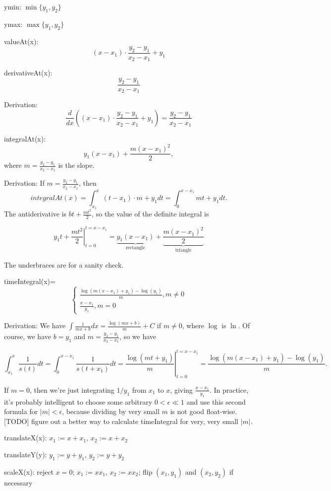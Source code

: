 \documentclass{article}
\begin{document}
ymin: $\min\{y_1, y_2\}$

ymax: $\max\{y_1, y_2\}$

valueAt(x): $$(x - x_1) \cdot \frac{y_2 - y_1}{x_2 - x_1} + y_1$$

derivativeAt(x): $$\frac{y_2-y_1}{x_2-x_1}$$

Derivation: $$\frac{d}{dx}\left((x - x_1) \cdot \frac{y_2 - y_1}{x_2 - x_1} + y_1\right) = \frac{y_2 - y_1}{x_2 - x_1}$$

integralAt(x): $$y_1(x-x_1) + \frac{m(x-x_1)^2}{2},$$ where $m=\frac{y_2 - y_1}{x_2 - x_1}$ is the slope.

Derivation: If $m=\frac{y_2 - y_1}{x_2 - x_1}$, then $$integralAt(x) = \int_{x_1}^x (t - x_1) \cdot m + y_1 dt = \int_{0}^{x-x_1} mt + y_1 dt.$$ The antiderivative is $bt + \frac{mt^2}{2}$, so the value of the definite integral is

$$\left. y_1t + \frac{mt^2}{2} \right\vert _ {t=0} ^ {t=x-x_1} = \underbrace{y_1(x-x_1)}_{\text{rectangle}} + \underbrace{\frac{m(x-x_1)^2}{2}}_{\text{triangle}}$$

The underbraces are for a sanity check.

timeIntegral(x)= $$\begin{cases}
\frac{\log(m(x-x_1)+y_1)-\log(y_1)}{m}, m\neq 0 \\
\frac{x-x_1}{y_1}, m = 0
\end{cases}$$

Derivation: We have $\int \frac{1}{mx+b} dx = \frac{\log(mx+b)}{m}+C$ if $m\neq 0$, where $\log$ is $\ln$. Of course, we have $b = y_1$ and $m=\frac{y_2 - y_1}{x_2 - x_1}$, so we have

$$\int_{x_1}^x \frac{1}{s(t)} dt = \int_{0}^{x-x_1} \frac{1}{s(t+x_1)} dt = \left. \frac{\log(mt+y_1)}{m} \right\vert _ {t=0}^{t=x-x_1} = \frac{\log(m(x-x_1)+y_1)-\log(y_1)}{m}.$$

If $m=0$, then we're just integrating $1/y_1$ from $x_1$ to $x$, giving $\frac{x-x_1}{y_1}$. In practice, it's probably intelligent to choose some arbitrary $0<\epsilon\ll 1$ and use this second formula for $|m| < \epsilon$, because dividing by very small $m$ is not good float-wise. [TODO] figure out a better way to calculate timeIntegral for very, very small $|m|$.

translateX(x): $x_1:=x+x_1$, $x_2:=x+x_2$

translateY(y): $y_1:=y+y_1$, $y_2:=y+y_2$

scaleX(x): reject $x=0$; $x_1:=xx_1$, $x_2:=xx_2$; flip $(x_1, y_1)$ and $(x_2, y_2)$ if necessary
\end{document}

